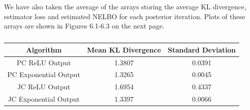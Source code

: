 \documentclass[honours,12pt]{unswthesis}
\numberwithin{equation}{section}
\theoremstyle{definition}
\begin{document}
We have also taken the average of the arrays storing the average KL divergence, estimator loss and estimated NELBO for each posterior iteration. Plots of these arrays are shown in Figures 6.1-6.3 on the next page.
\begin{table}[h!]
\centering
\begin{tabular}{|c|c|c|}
\hline
Algorithm & Mean KL Divergence & Standard Deviation\\
\hline
PC ReLU Output & 1.3807 & 0.0391\\
\hline
PC Exponential Output & 1.3265 & 0.0045\\
\hline
JC ReLU Output & 1.6954 & 0.4337\\
\hline
JC Exponential Output & 1.3397 & 0.0066\\
\hline
\end{tabular}
\caption{}
\end{table}
\newpage
\end{document}
